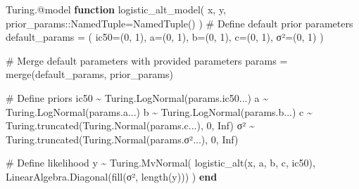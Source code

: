 \documentclass[
]{scrartcl}
\newenvironment{Shaded}{\begin{snugshade}}{\end{snugshade}}
\newcommand{\BuiltInTok}[1]{\textcolor[rgb]{0.00,0.23,0.31}{#1}}
\newcommand{\CommentTok}[1]{\textcolor[rgb]{0.37,0.37,0.37}{#1}}
\newcommand{\ConstantTok}[1]{\textcolor[rgb]{0.56,0.35,0.01}{#1}}
\newcommand{\DataTypeTok}[1]{\textcolor[rgb]{0.68,0.00,0.00}{#1}}
\newcommand{\FloatTok}[1]{\textcolor[rgb]{0.68,0.00,0.00}{#1}}
\newcommand{\FunctionTok}[1]{\textcolor[rgb]{0.28,0.35,0.67}{#1}}
\newcommand{\KeywordTok}[1]{\textcolor[rgb]{0.00,0.23,0.31}{\textbf{#1}}}
\newcommand{\NormalTok}[1]{\textcolor[rgb]{0.00,0.23,0.31}{#1}}
\newcommand{\OperatorTok}[1]{\textcolor[rgb]{0.37,0.37,0.37}{#1}}
\newcommand{\PreprocessorTok}[1]{\textcolor[rgb]{0.68,0.00,0.00}{#1}}
\begin{document}
\begin{Shaded}
\begin{Highlighting}[]
\NormalTok{Turing.}\PreprocessorTok{@model} \KeywordTok{function} \FunctionTok{logistic\_alt\_model}\NormalTok{(}
\NormalTok{    x, y, prior\_params}\OperatorTok{::}\DataTypeTok{NamedTuple}\NormalTok{=}\FunctionTok{NamedTuple}\NormalTok{()}
\NormalTok{)}
    \CommentTok{\# Define default prior parameters}
\NormalTok{    default\_params }\OperatorTok{=}\NormalTok{ (}
\NormalTok{        ic50}\OperatorTok{=}\NormalTok{(}\FloatTok{0}\NormalTok{, }\FloatTok{1}\NormalTok{),}
\NormalTok{        a}\OperatorTok{=}\NormalTok{(}\FloatTok{0}\NormalTok{, }\FloatTok{1}\NormalTok{),}
\NormalTok{        b}\OperatorTok{=}\NormalTok{(}\FloatTok{0}\NormalTok{, }\FloatTok{1}\NormalTok{),}
\NormalTok{        c}\OperatorTok{=}\NormalTok{(}\FloatTok{0}\NormalTok{, }\FloatTok{1}\NormalTok{),}
\NormalTok{        σ²}\OperatorTok{=}\NormalTok{(}\FloatTok{0}\NormalTok{, }\FloatTok{1}\NormalTok{)}
\NormalTok{    )}

    \CommentTok{\# Merge default parameters with provided parameters}
\NormalTok{    params }\OperatorTok{=} \FunctionTok{merge}\NormalTok{(default\_params, prior\_params)}

    \CommentTok{\# Define priors}
\NormalTok{    ic50 }\OperatorTok{\textasciitilde{}}\NormalTok{ Turing.}\FunctionTok{LogNormal}\NormalTok{(params.ic50}\OperatorTok{...}\NormalTok{)}
\NormalTok{    a }\OperatorTok{\textasciitilde{}}\NormalTok{ Turing.}\FunctionTok{LogNormal}\NormalTok{(params.a}\OperatorTok{...}\NormalTok{)}
\NormalTok{    b }\OperatorTok{\textasciitilde{}}\NormalTok{ Turing.}\FunctionTok{LogNormal}\NormalTok{(params.b}\OperatorTok{...}\NormalTok{)}
\NormalTok{    c }\OperatorTok{\textasciitilde{}}\NormalTok{ Turing.}\FunctionTok{truncated}\NormalTok{(Turing.}\FunctionTok{Normal}\NormalTok{(params.c}\OperatorTok{...}\NormalTok{), }\FloatTok{0}\NormalTok{, }\ConstantTok{Inf}\NormalTok{)}
\NormalTok{    σ² }\OperatorTok{\textasciitilde{}}\NormalTok{ Turing.}\FunctionTok{truncated}\NormalTok{(Turing.}\FunctionTok{Normal}\NormalTok{(params.σ²}\OperatorTok{...}\NormalTok{), }\FloatTok{0}\NormalTok{, }\ConstantTok{Inf}\NormalTok{)}

    \CommentTok{\# Define likelihood}
\NormalTok{    y }\OperatorTok{\textasciitilde{}}\NormalTok{ Turing.}\FunctionTok{MvNormal}\NormalTok{(}
        \FunctionTok{logistic\_alt}\NormalTok{(x, a, b, c, ic50),}
        \BuiltInTok{LinearAlgebra}\NormalTok{.}\FunctionTok{Diagonal}\NormalTok{(}\FunctionTok{fill}\NormalTok{(σ², }\FunctionTok{length}\NormalTok{(y)))}
\NormalTok{    )}
\KeywordTok{end}
\end{Highlighting}
\end{Shaded}
\end{document}
